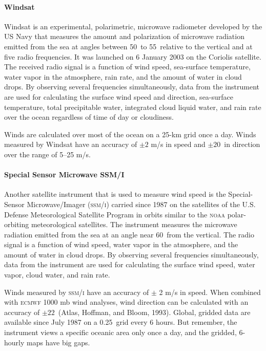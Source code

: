 \paragraph{Windsat}
Windsat is an experimental, polarimetric, microwave
radiometer developed by the US Navy that measures the amount and
polarization of microwave radiation emitted from the sea at angles
between 50\degrees\ to 55\degrees\ relative to the vertical and at
five radio frequencies. It was launched on 6 January 2003 on the
Coriolis satellite. The received radio signal is a function of wind
speed, sea-surface temperature, water vapor in the atmosphere, rain
rate, and the amount of water in cloud drops. By observing several
frequencies simultaneously, data from the instrument are used for
calculating the surface wind speed and direction, sea-surface
temperature, total precipitable water, integrated cloud liquid water,
and rain rate over the ocean regardless of time of day or cloudiness.

Winds are calculated over most of the ocean on a 25-km grid once a
day. Winds measured by Windsat have an accuracy of $\pm 2$ m/s in
speed and $\pm 20$\degrees\ in direction over the range of 5--25 m/s.

\paragraph{Special Sensor Microwave SSM/I}
Another satellite instrument that is used to measure wind speed is the
Special-Sensor Microwave/Imager (\textsc{ssm/i}) carried since 1987 on
the satellites of the U.S. Defense Meteorological Satellite Program in
orbits similar to the \textsc{noaa} polar-orbiting meteorological
satellites. The instrument measures the microwave radiation emitted
from the sea at an angle near 60\degrees\ from the vertical. The radio
signal is a function of wind speed, water vapor in the atmosphere, and
the amount of water in cloud drops. By observing several frequencies
simultaneously, data from the instrument are used for calculating the
surface wind speed, water vapor, cloud water, and rain rate.

Winds measured by \textsc{ssm/i} have an
accuracy of $\pm$ 2 m/s in speed. When
combined with \textsc{ecmwf} 1000 mb wind analyses, wind direction can
be calculated with an accuracy of $\pm 22$\degrees\ (Atlas, Hoffman,
and Bloom, 1993). Global, gridded data are available since July 1987
on a 0.25\degrees\ grid every 6 hours. But remember, the instrument
views a specific oceanic area only once a day, and the gridded,
6-hourly maps have big gaps.

